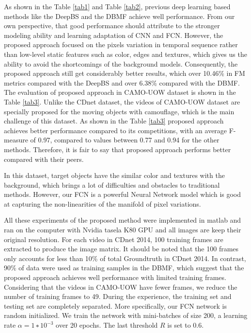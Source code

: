 \documentclass[journal]{IEEEtran}
\newcommand{\reftab}[1]{Table \ref{#1}}
\begin{document}
	As shown in the \reftab{tab1} and \reftab{tab2}, previous deep learning based methods like the DeepBS and the DBMF achieve well performance. 
From our own perspective, that good performance should attribute to the stronger modeling ability and learning adaptation of CNN and FCN. 
However, the proposed approach focused on the pixels variation in temporal sequence rather than low-level static features such as color, edges and textures, which gives us the ability to avoid the shortcomings of the background models. 
Consequently, the proposed approach still get considerably better results, which over 10.46\% in FM metrics compared with the DeepBS and over 6.38\% compared with the DBMF.
The evaluation of proposed approach in CAMO-UOW dataset is shown in the \reftab{tab3}. 
Unlike the CDnet dataset, the videos of CAMO-UOW dataset are specially proposed for the moving objects with camouflage, which is the main challenge of this dataset. 
As shown in the \reftab{tab3} proposed approach achieves better performance compared to its competitions, with an average F-measure of 0.97, compared to values between 0.77 and 0.94 for the other methods. 
Therefore, it is fair to say that proposed approach performs better compared with their peers. 


In this dataset, target objects have the similar color and textures with the background, which brings a lot of difficulties and obstacles to traditional methods. 
However, our FCN is a powerful Neural Network model which is good at capturing the non-linearities of the manifold of pixel variations. 


All these experiments of the proposed method were implemented in matlab and ran on the computer with Nvidia tasela K80 GPU and all images are keep their original resolution. 
For each video in CDnet 2014, 100 training frames are extracted to produce the image matrix. 
It should be noted that the 100 frames only accounts for less than 10\% of total Groundtruth in CDnet 2014. 
In contrast, 90\% of data were used as training samples in the DBMF, which suggest that the proposed approach achieves well performance with limited training frames. 
Considering that the videos in CAMO-UOW have fewer frames, we reduce the number of training frames to 49. 
During the experience, the training set and testing set are completely separated. 
More specifically, our FCN network is random initialized. 
We train the network with mini-batches of size 200, a learning rate $α = 1 ∗ 10^{−3}$ over 20 epochs. 
The last threshold $R$ is set to 0.6.
\end{document}

